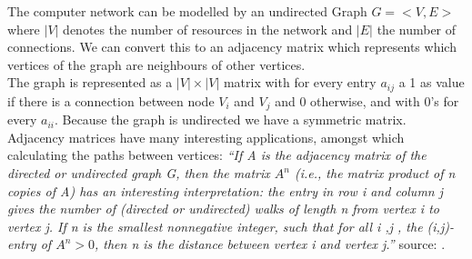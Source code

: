 


The computer network can be modelled by an undirected Graph $G = < V, E> $ where $|V|$ denotes the number of resources in the network and $|E|$ the number of connections. We can convert this to an adjacency matrix which represents which vertices of the graph are neighbours of other vertices. \\
The graph is represented as a $|V| \times |V|$ matrix with for every entry $a_{ij}$ a 1 as value if there is a connection between node $V_{i}$ and $V_{j}$ and 0 otherwise, and with 0's for every $a_{ii}$. Because the graph is undirected we have a symmetric matrix.  \\ 

Adjacency matrices have many interesting applications, amongst which calculating the paths between vertices:
\textit{``If \textit{A} is the adjacency matrix of the directed or undirected graph \textit{G}, then the matrix $A^{n}$ (i.e., the matrix product of \textit{n} copies of \textit{A}) has an interesting interpretation: the entry in row \textit{i} and column \textit{j} gives the number of (directed or undirected) walks of length \textit{n} from vertex \textit{i} to vertex \textit{j}. If \textit{n} is the smallest nonnegative integer, such that for all i ,j , the (i,j)-entry of $A^{n} > 0$, then n is the distance between vertex i and vertex \textit{j}.''}  source: \cite{wikimatrix} .\\


